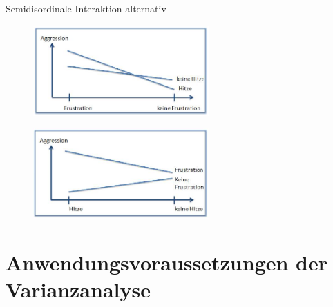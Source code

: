 \documentclass{beamer}
\begin{document}
	
	\begin{frame}{Semidisordinale Interaktion alternativ}
		\begin{figure}
			\centering
			\includegraphics[width=0.6\textwidth]{Bilder/HybrideInteraktion1.jpg}
		\end{figure}
		\begin{figure}
			\centering
			\includegraphics[width=0.6\textwidth]{Bilder/HybrideInteraktion2.jpg}
		\end{figure}
	\end{frame}
	
	\section{Anwendungsvoraussetzungen der Varianzanalyse}
	
\end{document}
